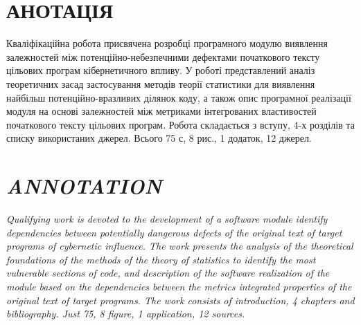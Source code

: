 \chapter*{АНОТАЦІЯ}
\label{0annotation:annotation}
Кваліфікаційна робота присвячена розробці програмного модулю виявлення залежностей між потенційно-небезпечними дефектами початкового тексту цільових програм кібернетичного впливу. У роботі представлений аналіз теоретичних засад застосування методів теорії статистики для виявлення найбільш потенційно-вразливих ділянок коду, а також опис програмної реалізації модуля на основі залежностей між метриками інтегрованих властивостей початкового тексту цільових програм. Робота складається з вступу, 4-х розділів та списку використаних джерел. Всього 75 с, 8 рис., 1 додаток, 12 джерел.


\pagebreak

\chapter*{{\it ANNOTATION}}
\normalfont

{\it Qualifying work is devoted to the development of a software module identify dependencies between potentially dangerous defects of the original text of target programs of cybernetic influence. The work presents the analysis of the theoretical foundations of the methods of the theory of statistics to identify the most vulnerable sections of code, and description of the software realization of the module based on the dependencies between the metrics integrated properties of the original text of target programs. The work consists of introduction, 4 chapters and bibliography. Just 75, 8 figure, 1 application, 12 sources.}